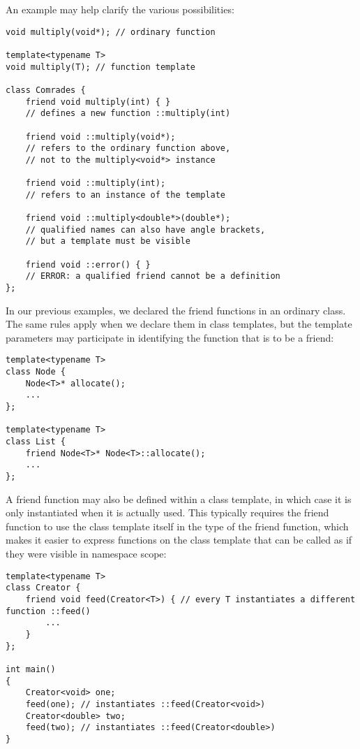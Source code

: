 An example may help clarify the various possibilities:

\begin{lstlisting}[style=styleCXX]
void multiply(void*); // ordinary function

template<typename T>
void multiply(T); // function template

class Comrades {
	friend void multiply(int) { }
	// defines a new function ::multiply(int)
	
	friend void ::multiply(void*);
	// refers to the ordinary function above,
	// not to the multiply<void*> instance
	
	friend void ::multiply(int);
	// refers to an instance of the template
	
	friend void ::multiply<double*>(double*);
	// qualified names can also have angle brackets,
	// but a template must be visible
	
	friend void ::error() { }
	// ERROR: a qualified friend cannot be a definition
};
\end{lstlisting}

In our previous examples, we declared the friend functions in an ordinary class. The same rules apply
when we declare them in class templates, but the template parameters may participate in identifying
the function that is to be a friend:

\begin{lstlisting}[style=styleCXX]
template<typename T>
class Node {
	Node<T>* allocate();
	...
};

template<typename T>
class List {
	friend Node<T>* Node<T>::allocate();
	...
};
\end{lstlisting}

A friend function may also be defined within a class template, in which case it is only instantiated when it is actually used. This typically requires the friend function to use the class template itself in the type of the friend function, which makes it easier to express functions on the class template that can be called as if they were visible in namespace scope:

\begin{lstlisting}[style=styleCXX]
template<typename T>
class Creator {
	friend void feed(Creator<T>) { // every T instantiates a different function ::feed()
		...
	}
};

int main()
{
	Creator<void> one;
	feed(one); // instantiates ::feed(Creator<void>)
	Creator<double> two;
	feed(two); // instantiates ::feed(Creator<double>)
}
\end{lstlisting}

